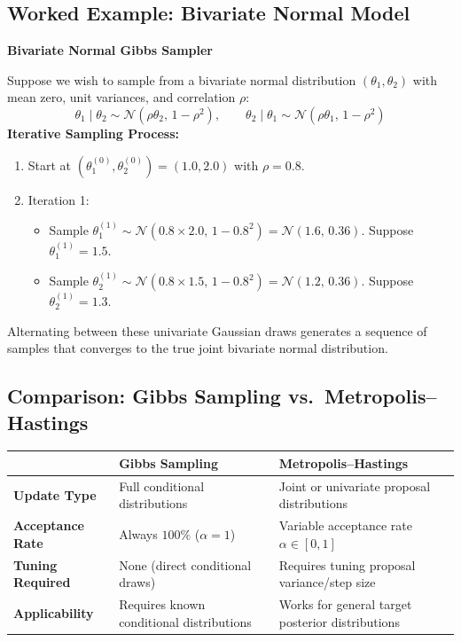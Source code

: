 \documentclass[12pt,a4paper]{article}
\begin{document}
\subsection{Worked Example: Bivariate Normal Model}

\begin{example}
\textbf{Bivariate Normal Gibbs Sampler}

Suppose we wish to sample from a bivariate normal distribution $(\theta_1, \theta_2)$ with mean zero, unit variances, and correlation $\rho$:
\[
\theta_1 \mid \theta_2 \sim \mathcal{N}(\rho \theta_2, \, 1 - \rho^2), \qquad \theta_2 \mid \theta_1 \sim \mathcal{N}(\rho \theta_1, \, 1 - \rho^2)
\]
\textbf{Iterative Sampling Process:}
\begin{enumerate}[leftmargin=1.5em]
    \item Start at $(\theta_1^{(0)}, \theta_2^{(0)}) = (1.0, 2.0)$ with $\rho = 0.8$.
    \item Iteration 1:
    \begin{itemize}[leftmargin=1.5em]
        \item Sample $\theta_1^{(1)} \sim \mathcal{N}(0.8 \times 2.0, \, 1 - 0.8^2) = \mathcal{N}(1.6, \, 0.36)$. Suppose $\theta_1^{(1)} = 1.5$.
        \item Sample $\theta_2^{(1)} \sim \mathcal{N}(0.8 \times 1.5, \, 1 - 0.8^2) = \mathcal{N}(1.2, \, 0.36)$. Suppose $\theta_2^{(1)} = 1.3$.
    \end{itemize}
\end{enumerate}
Alternating between these univariate Gaussian draws generates a sequence of samples that converges to the true joint bivariate normal distribution.
\end{example}

\subsection{Comparison: Gibbs Sampling vs.\ Metropolis--Hastings}

\begin{center}
\renewcommand{\arraystretch}{1.3}
\begin{tabular}{|l|p{4.2cm}|p{4.2cm}|}
\hline
& \textbf{Gibbs Sampling} & \textbf{Metropolis--Hastings} \\
\hline
\textbf{Update Type} & Full conditional distributions & Joint or univariate proposal distributions \\
\textbf{Acceptance Rate} & Always $100\%$ ($\alpha = 1$) & Variable acceptance rate $\alpha \in [0, 1]$ \\
\textbf{Tuning Required} & None (direct conditional draws) & Requires tuning proposal variance/step size \\
\textbf{Applicability} & Requires known conditional distributions & Works for general target posterior distributions \\
\hline
\end{tabular}
\end{center}
\end{document}
